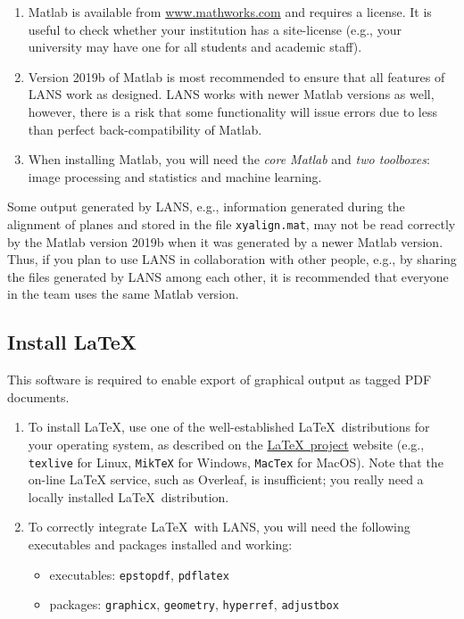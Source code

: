 \documentclass[a4paper, 11pt]{article}
\newcommand{\ttt}[1]{\texttt{#1}}
\newcommand\mnote{\marginnote{\fbox{\textbf{\bf Note}}}}
\begin{document}
\begin{enumerate}

\item Matlab is available from \url{www.mathworks.com} and requires a license. It is useful to check whether your institution has a site-license (e.g., your university may have one for all students and academic staff). 

\item Version 2019b of Matlab is most recommended to ensure that all features of LANS work as designed. LANS works with newer Matlab versions as well, however, there is a risk that some functionality will issue errors due to less than perfect back-compatibility of Matlab.

\item When installing Matlab, you will need the \emph{core Matlab} and \emph{two toolboxes}: image processing and statistics and machine learning. 

\end{enumerate}

\mnote
Some output generated by LANS, e.g., information generated during the alignment of planes and stored in the file \ttt{xyalign.mat}, may not be read correctly by the Matlab version 2019b when it was generated by a newer Matlab version. Thus, if you plan to use LANS in collaboration with other people, e.g., by sharing the files generated by LANS among each other, it is recommended that everyone in the team uses the same Matlab version.


\subsection{Install \LaTeX}

This software is required to enable export of graphical output as tagged PDF documents. 

\begin{enumerate}
 
\item To install \LaTeX, use one of the well-established \LaTeX\ distributions for your operating system, as described on the \href{https://www.latex-project.org/get/}{\LaTeX\ project} website (e.g., \ttt{texlive} for Linux, \ttt{MikTeX} for Windows, \ttt{MacTex} for MacOS). Note that the on-line LaTeX service, such as Overleaf, is insufficient; you really need a locally installed \LaTeX\ distribution.
 
\item To correctly integrate \LaTeX\ with LANS, you will need the following executables and packages installed and working:
 
\begin{itemize}
\item executables: \ttt{epstopdf}, \ttt{pdflatex}
\item packages: \ttt{graphicx}, \ttt{geometry}, \ttt{hyperref}, \ttt{adjustbox}
\end{itemize}
 
\end{enumerate}
 
\end{document}
